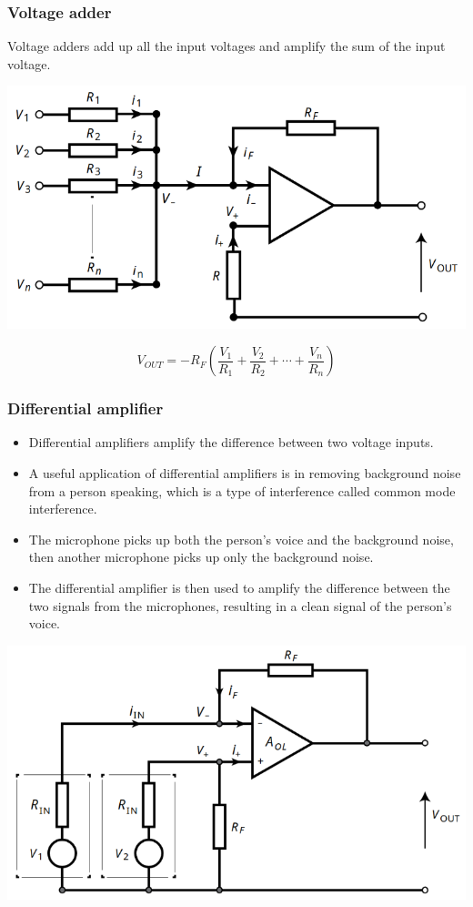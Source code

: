 \documentclass[11pt]{article}
\begin{document}
\subsubsection{Voltage adder}
\label{sec:orgfe1c6d1}
Voltage adders add up all the input voltages and amplify the sum of the input voltage.
\begin{center}
\includegraphics[width=.9\linewidth]{./images/voltage-adder.png}
\end{center}
\[V_{OUT} = -R_F \left(\frac{V_1}{R_1} + \frac{V_2}{R_2} + \cdots + \frac{V_n}{R_n} \right)\]

 \newpage

\subsubsection{Differential amplifier}
\label{sec:orgdca3516}
\begin{itemize}
\item Differential amplifiers amplify the difference between two voltage inputs.
\item A useful application of differential amplifiers is in removing background noise from a person speaking, which is a type of interference called common mode interference.
\item The microphone picks up both the person's voice and the background noise, then another microphone picks up only the background noise.
\item The differential amplifier is then used to amplify the difference between the two signals from the microphones, resulting in a clean signal of the person's voice.
\end{itemize}

\begin{center}
\includegraphics[scale=0.8]{./images/differential-amplifier.png}
\end{center}
\end{document}
